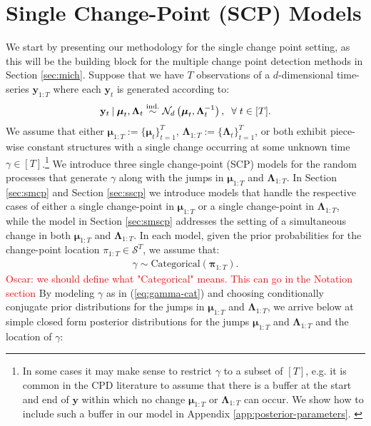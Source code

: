 \section{Single Change-Point (SCP) Models}
\label{sec:scp}



We start by presenting our methodology for the single change point setting, as this will be the building block for the multiple change point detection methods in Section  \ref{sec:mich}. Suppose that we have $T$ observations of a $d$-dimensional time-series $\mathbf{y}_{1:T}$ where each $\mathbf{y}_t$ is generated according to:
\begin{align}\label{eq:dgp}
    \mathbf{y}_t \:|\: \boldsymbol{\mu}_t, \boldsymbol{\Lambda}_t \overset{\text{ind.}}{\sim} \mathcal{N}_d\left(\boldsymbol{\mu}_t, \boldsymbol{\Lambda}^{-1}_t\right), \;\;\forall\; t \in [T].
\end{align}
We assume that either $\boldsymbol{\mu}_{1:T} := \{\boldsymbol{\mu}_t\}_{t=1}^{T}$, $\boldsymbol{\Lambda}_{1:T} := \{\boldsymbol{\Lambda}_t\}^{T}_{t=1}$, or both exhibit piece-wise constant structures with a single change occurring at some unknown time $\gamma \in [T]$.\footnote{In some cases it may make sense to restrict $\gamma$ to a subset of $[T]$, e.g. it is common in the CPD literature to assume that there is a buffer at the start and end of $\mathbf{y}$ within which no change $\boldsymbol{\mu}_{1:T}$ or $\boldsymbol{\Lambda}_{1:T}$ can occur. We show how to include such a buffer in our model in Appendix \ref{app:posterior-parameters}. \label{fn:buffer}} We introduce three single change-point (SCP) models for the random processes that generate $\gamma$ along with the jumps in $\boldsymbol{\mu}_{1:T}$ and $\boldsymbol{\Lambda}_{1:T}$. In Section \ref{sec:smcp} and Section \ref{sec:sscp} we introduce models that handle the respective cases of either a single change-point in $\boldsymbol{\mu}_{1:T}$ or a single change-point in $\boldsymbol{\Lambda}_{1:T}$, while the model in Section \ref{sec:smscp} addresses the setting of a simultaneous change in both $\boldsymbol{\mu}_{1:T}$ and $\boldsymbol{\Lambda}_{1:T}$.  In each model, given the prior probabilities for the change-point location $\pi_{1:T} \in \mathcal{S}^T$, we assume that:
\begin{align}
    \gamma \sim \text{Categorical}(\boldsymbol{\pi}_{1:T}). \label{eq:gamma-cat}
\end{align}
\textcolor{red}{Oscar:  we should define what "Categorical" means. This can go in the Notation section }
By modeling $\gamma$ as in (\ref{eq:gamma-cat}) and choosing conditionally conjugate prior distributions for the jumps in $\boldsymbol{\mu}_{1:T}$ and $\boldsymbol{\Lambda}_{1:T}$, we arrive below at simple closed form posterior distributions for the jumps $\boldsymbol{\mu}_{1:T}$ and $\boldsymbol{\Lambda}_{1:T}$ and the location of $\gamma$:
